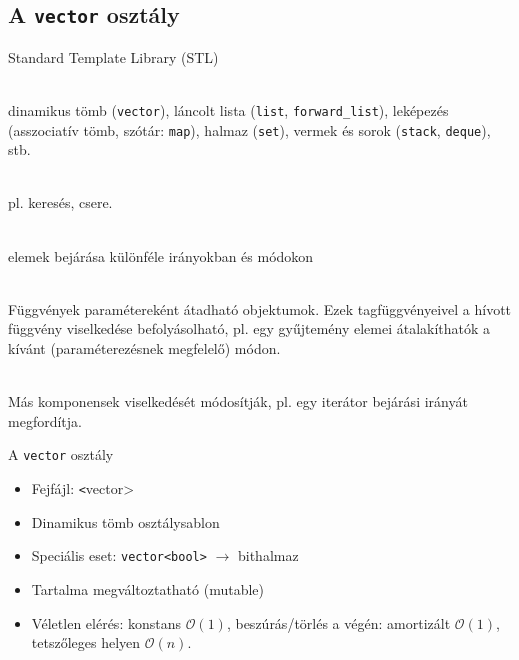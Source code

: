 \subsection{A \texttt{vector} osztály}

\begin{frame}
    Standard Template Library (STL)
    \small
    \begin{description}[m]
        \item[Gyűjtemények (containers)] \hfill \\ dinamikus tömb (\texttt{vector}), láncolt lista (\texttt{list}, \texttt{forward\_list}), leképezés (asszociatív tömb, szótár: \texttt{map}), halmaz (\texttt{set}), vermek és sorok (\texttt{stack}, \texttt{deque}), stb.
        \item[Algoritmusok] \hfill \\ pl. keresés, csere. 
        \item[Iterátorok] \hfill \\ elemek bejárása különféle irányokban és módokon
        \item[\emph{Függvény objektumok} (functors)] \hfill \\ Függvények paramétereként átadható objektumok. Ezek tagfüggvényeivel a hívott függvény viselkedése befolyásolható, pl. egy gyűjtemény elemei átalakíthatók a kívánt (paraméterezésnek megfelelő) módon.
        \item[\emph{Adapterek} (adapters)] \hfill \\ Más komponensek viselkedését módosítják, pl. egy iterátor bejárási irányát megfordítja. 
    \end{description}
\end{frame}

\begin{frame}
    A \texttt{vector} osztály
    \begin{itemize}
        \item Fejfájl: \texttt<vector>
        \item Dinamikus tömb osztálysablon
        \item Speciális eset: \texttt{vector<bool>} $\to$ bithalmaz
        \item Tartalma megváltoztatható (mutable)
        \item Véletlen elérés: konstans  $\mathcal{O}(1)$, beszúrás/törlés a végén: amortizált $\mathcal{O}(1)$, tetszőleges helyen $\mathcal{O}(n)$.
    \end{itemize}
\end{frame}


